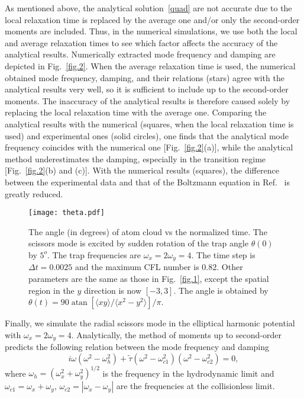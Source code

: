 As mentioned above, the analytical solution~\eqref{quad} are not accurate due to the local relaxation time is replaced by the average one and/or only the second-order moments are included. Thus, in the numerical simulations, we use both the local and average relaxation times to see which factor affects the accuracy of the analytical results. Numerically extracted mode frequency and damping are depicted in Fig.~\ref{fig.2}. When the average relaxation time is used, the numerical obtained mode frequency, damping, and their relations (stars) agree with the analytical results very well, so it is sufficient to include up to the second-order moments. The inaccuracy of the analytical results is therefore caused solely by replacing the local relaxation time with the average one. Comparing the analytical results with the numerical (squares, when the local relaxation time is used) and experimental ones (solid circles), one finds that the analytical mode frequency coincides with the numerical one [Fig.~\ref{fig.2}(a)], while the analytical method underestimates the damping, especially in the transition regime [Fig.~\ref{fig.2}(b) and (c)]. With the numerical results (squares), the difference between the experimental data and that of the Boltzmann equation in Ref.~\cite{Riedl2008} is greatly reduced.


\begin{figure}[t]
	\center
	\texttt{[image: theta.pdf]} 
	\caption[The angle (in degrees) of atom cloud vs the normalized time.]{The angle (in degrees) of atom cloud vs the normalized time. The scissors mode is excited by sudden rotation of the trap angle $\theta(0)$ by $5^o$. The trap frequencies are $\omega_x=2\omega_y=4$. The time step is $\Delta t=0.0025$ and the maximum CFL number is $0.82$. Other parameters are the same as those in Fig.~\ref{fig.1}, except the spatial region in the $y$ direction is now $[-3,3]$. The angle is obtained by $\theta(t)=90\operatorname{atan}[\langle xy\rangle/\langle x^2-y^2\rangle]/\pi$. } \label{theta}
\end{figure}


Finally, we simulate the radial scissors mode in the elliptical harmonic potential with $\omega_x=2\omega_y=4$. Analytically, the method of moments up to second-order predicts the following relation between the mode frequency and damping~\cite{Bruun2007}
\begin{equation}\label{scissors}
{i\omega}(\omega^2-\omega_h^2)
+{\widetilde{\tau}}(\omega^2-\omega_{c1}^2)(\omega^2-\omega_{c2}^2)=0,
\end{equation}
where $\omega_h=(\omega_x^2+\omega_y^2)^{1/2}$ is the frequency in the hydrodynamic limit and $\omega_{c1}=\omega_x+\omega_y$, $\omega_{c2}=|\omega_x-\omega_y|$ are the frequencies at the collisionless limit.


